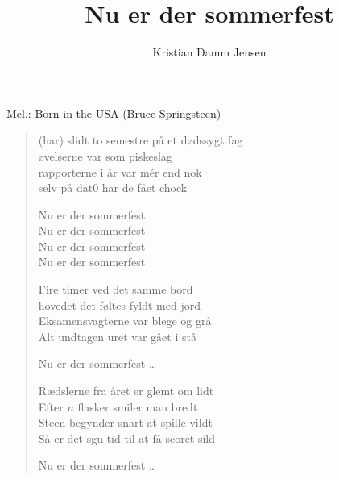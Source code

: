 \documentclass[a4paper,11pt]{article}
\title{Nu er der sommerfest}
\author{Kristian Damm Jensen}
\begin{document}
\begin{center}
{\large Mel.: Born in the USA (Bruce Springsteen)}
\end{center}

\begin{verse}
(har) slidt to semestre på et dødssygt fag \\
øvelserne var som piskeslag \\
rapporterne i år var m\'er end nok \\
selv på dat0 har de fået chock

Nu er der sommerfest \\
Nu er der sommerfest \\
Nu er der sommerfest \\
Nu er der sommerfest 

Fire timer ved det samme bord \\
hovedet det føltes fyldt med jord \\
Eksamensvagterne var blege og grå \\
Alt undtagen uret var gået i stå

Nu er der sommerfest \dots

Rædslerne fra året er glemt om lidt \\
Efter $n$ flasker smiler man bredt \\
Steen begynder snart at spille vildt \\
Så er det sgu tid til at få scoret sild

Nu er der sommerfest \dots

\end{verse}
\end{document}
